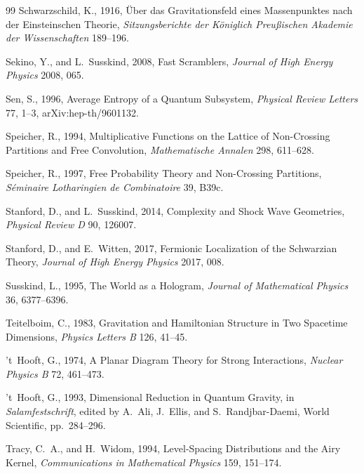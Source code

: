 \documentclass[11pt,letterpaper]{article}
\theoremstyle{plain}
\theoremstyle{definition}
\theoremstyle{remark}
\begin{document}
\begin{thebibliography}{99}
Schwarzschild, K., 1916, \"{U}ber das Gravitationsfeld eines Massenpunktes nach der Einsteinschen Theorie, \textit{Sitzungsberichte der K\"{o}niglich Preu{\ss}ischen Akademie der Wissenschaften} 189--196.

Sekino, Y., and L.~Susskind, 2008, Fast Scramblers, \textit{Journal of High Energy Physics} 2008, 065.

Sen, S., 1996, Average Entropy of a Quantum Subsystem,
\textit{Physical Review Letters} 77, 1--3, arXiv:hep-th/9601132.

Speicher, R., 1994, Multiplicative Functions on the Lattice of Non-Crossing Partitions and Free Convolution, \textit{Mathematische Annalen} 298, 611--628.

Speicher, R., 1997, Free Probability Theory and Non-Crossing Partitions, \textit{S\'{e}minaire Lotharingien de Combinatoire} 39, B39c.

Stanford, D., and L.~Susskind, 2014, Complexity and Shock Wave Geometries, \textit{Physical Review D} 90, 126007.

Stanford, D., and E.~Witten, 2017, Fermionic Localization of the Schwarzian Theory, \textit{Journal of High Energy Physics} 2017, 008.

Susskind, L., 1995, The World as a Hologram, \textit{Journal of Mathematical Physics} 36, 6377--6396.

Teitelboim, C., 1983, Gravitation and Hamiltonian Structure in Two Spacetime Dimensions, \textit{Physics Letters B} 126, 41--45.

't~Hooft, G., 1974, A Planar Diagram Theory for Strong Interactions, \textit{Nuclear Physics B} 72, 461--473.

't~Hooft, G., 1993, Dimensional Reduction in Quantum Gravity, in \textit{Salamfestschrift}, edited by A.~Ali, J.~Ellis, and S.~Randjbar-Daemi, World Scientific, pp.~284--296.

Tracy, C.~A., and H.~Widom, 1994, Level-Spacing Distributions and the Airy Kernel, \textit{Communications in Mathematical Physics} 159, 151--174.


\end{thebibliography}
\end{document}
